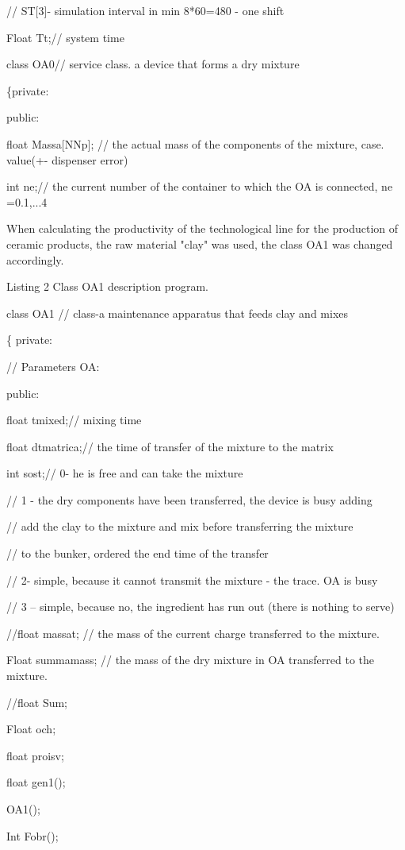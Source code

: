 // ST{[}3{]}- simulation interval in min 8*60=480 - one shift

Float Tt;// system time

class OA0// service class. a device that forms a dry mixture

\{private:

public:

float Massa{[}NNp{]}; // the actual mass of the components of the
mixture, case. value(+- dispenser error)

int ne;// the current number of the container to which the OA is
connected, ne =0.1,...4

When calculating the productivity of the technological line for the
production of ceramic products, the raw material "clay" was used, the
class OA1 was changed accordingly.

Listing 2 Class OA1 description program.

class OA1 // class-a maintenance apparatus that feeds clay and mixes

\{ private:

// Parameters OA:

public:

float tmixed;// mixing time

float dtmatrica;// the time of transfer of the mixture to the matrix

int sost;// 0- he is free and can take the mixture

// 1 - the dry components have been transferred, the device is busy
adding

// add the clay to the mixture and mix before transferring the mixture

// to the bunker, ordered the end time of the transfer

// 2- simple, because it cannot transmit the mixture - the trace. OA is
busy

// 3 -- simple, because no, the ingredient has run out (there is nothing
to serve)

//float massat; // the mass of the current charge transferred to the
mixture.

Float summamass; // the mass of the dry mixture in OA transferred to the
mixture.

//float Sum;

Float och;

float proisv;

float gen1();

OA1();

Int Fobr();


